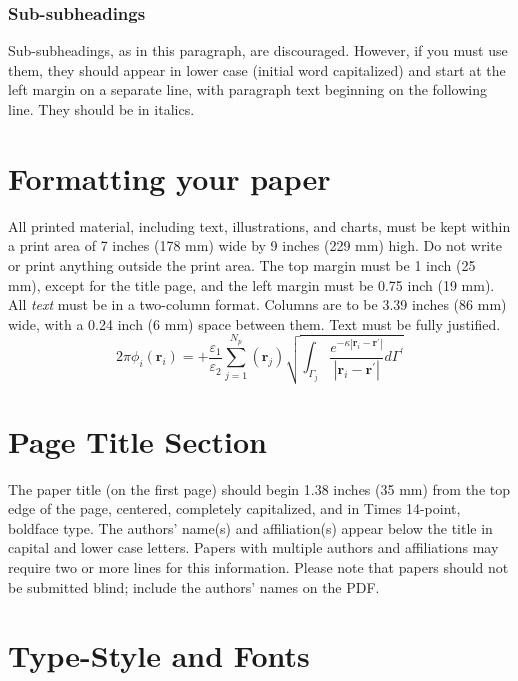 \documentclass{article}
\begin{document}
\subsubsection{Sub-subheadings}
\label{sssec:subsubhead}

Sub-subheadings, as in this paragraph, are discouraged. However, if you
must use them, they should appear in lower case (initial word
capitalized) and start at the left margin on a separate line, with paragraph
text beginning on the following line.  They should be in italics.

\section{Formatting your paper}
\label{sec:format}
All printed material, including text, illustrations, and charts, must be kept
within a print area of 7 inches (178 mm) wide by 9 inches (229 mm) high. Do
not write or print anything outside the print area. The top margin must be 1
inch (25 mm), except for the title page, and the left margin must be 0.75 inch
(19 mm).  All \emph{text} must be in a two-column format. Columns are to be 3.39
inches (86 mm) wide, with a 0.24 inch (6 mm) space between them. Text must be
fully justified.
\begin{equation}
  2 \pi \phi_i (\bm r_i) =
    + \frac{\varepsilon_1}{\varepsilon_2}
      \sum_{j=1}^{N_p} (\bm r_j)
        \sqrt{ 
          \int_{\Gamma_j} 
            \frac{e^{-\kappa | \bm r_i - \bm r^\prime | }}
                 { | \bm r_i - \bm r^\prime | } 
              d\Gamma^\prime }
\end{equation}


\section{Page Title Section}
\label{sec:pagestyle}

The paper title (on the first page) should begin 1.38 inches (35 mm) from the
top edge of the page, centered, completely capitalized, and in Times 14-point,
boldface type.  The authors' name(s) and affiliation(s) appear below the title
in capital and lower case letters.  Papers with multiple authors and
affiliations may require two or more lines for this information. Please note
that papers should not be submitted blind; include the authors' names on the
PDF.

\section{Type-Style and Fonts}
\label{sec:typestyle}
\end{document}
